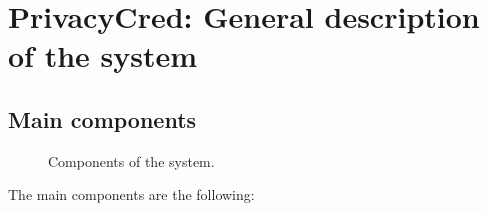 \documentclass[letterpaper,10pt,english]{sphinxmanual}
\begin{document}
\section{PrivacyCred: General description of the system}
\label{\detokenize{privacycred:privacycred-general-description-of-the-system}}

\subsection{Main components}
\label{\detokenize{privacycred:main-components}}
\begin{figure}[htbp]
\centering
\capstart

\noindent{}
\caption{Components of the system.}\label{\detokenize{privacycred:id2}}\end{figure}

\sphinxAtStartPar
The main components are the following:
\end{document}

